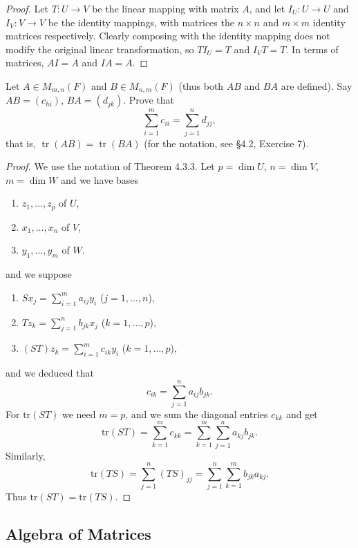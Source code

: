 \begin{proof}
    Let $T: U \to V$ be the linear mapping with matrix $A$, and let $I_U: U \to U$
    and $I_V: V \to V$ be the identity mappings, with matrices the $n \times n$ and
    $m \times m$ identity matrices respectively.
    Clearly composing with the identity mapping does not modify the original linear transformation,
    so $T I_U = T$ and $I_V T = T$.
    In terms of matrices, $AI = A$ and $IA = A$.
\end{proof}

\begin{tcolorbox}[title=Exercise 4, breakable]
    Let $A \in M_{m,n}(F)$ and $B \in M_{n,m}(F)$ (thus both $AB$ and $BA$ are
    defined). Say $AB = (c_{hi})$, $BA = (d_{jk})$. Prove that
    \[
        \sum_{i=1}^{m} c_{ii} = \sum_{j=1}^{n} d_{jj},
    \]
    that is, $\operatorname{tr}(AB) = \operatorname{tr}(BA)$ (for the notation, see \S4.2, Exercise 7).
\end{tcolorbox}

\begin{proof}
    We use the notation of Theorem 4.3.3.
    Let $p = \dim U$, $n = \dim V$, $m = \dim W$ and we have bases
    \begin{enumerate}
        \item $z_1, \ldots, z_p$ of $U$,
        \item $x_1, \ldots, x_n$ of $V$,
        \item $y_1, \ldots, y_m$ of $W$.
    \end{enumerate}
    and we suppose
    \begin{enumerate}
        \item $S x_j = \sum_{i=1}^m a_{ij} y_i$ \quad ($j = 1, \ldots, n$),
        \item $T z_k = \sum_{j=1}^n b_{jk} x_j$ \quad ($k = 1, \ldots, p$),
        \item $(ST) z_k = \sum_{i=1}^m c_{ik} y_i$ \quad ($k = 1, \ldots, p$),
    \end{enumerate}
    and we deduced that
    \[c_{ik} = \sum_{j=1}^n a_{ij} b_{jk}.\]
    For $\text{tr}(ST)$ we need $m = p$, and we sum the
    diagonal entries $c_{kk}$ and get
    \[\text{tr}(ST) = \sum_{k=1}^m c_{kk} = \sum_{k=1}^m \sum_{j=1}^n a_{kj} b_{jk}.\]
    Similarly,
    \[\text{tr}(TS) = \sum_{j=1}^n (TS)_{jj} = \sum_{j=1}^n \sum_{k=1}^m b_{jk} a_{kj}.\]
    Thus $\text{tr}(ST) = \text{tr}(TS)$.
\end{proof}

\subsection{Algebra of Matrices}

